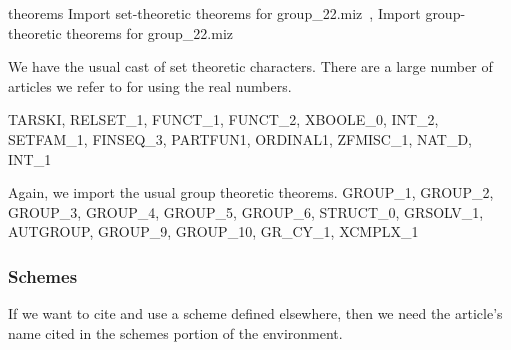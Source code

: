 \nwenddocs{}\endmoddef\nwstartdeflinemarkup{}\nwenddeflinemarkup
theorems
  \LA{}Import set-theoretic theorems for \code{}group{\_}22.miz\edoc{}~{\nwtagstyle{}}\RA{},
  \LA{}Import group-theoretic theorems for \code{}group{\_}22.miz\edoc{}~{\nwtagstyle{}}\RA{}
\nwendcode{}\nwdocspar

We have the usual cast of set theoretic characters. There are a large
number of articles we refer to for using the real numbers.

\nwenddocs{}\endmoddef\nwstartdeflinemarkup{}\nwenddeflinemarkup
TARSKI, RELSET_1, FUNCT_1, FUNCT_2, XBOOLE_0, INT_2, SETFAM_1, FINSEQ_3,
PARTFUN1, ORDINAL1, ZFMISC_1, NAT_D, INT_1
\nwendcode{}\nwdocspar

Again, we import the usual group theoretic theorems.
\nwenddocs{}\endmoddef\nwstartdeflinemarkup{}\nwenddeflinemarkup
GROUP_1, GROUP_2, GROUP_3, GROUP_4, GROUP_5, GROUP_6, STRUCT_0, GRSOLV_1,
AUTGROUP, GROUP_9, GROUP_10, GR_CY_1, XCMPLX_1
\nwendcode{}\nwdocspar

\subsubsection{Schemes}
If we want to cite and use a scheme defined elsewhere, then we need the
article's name cited in the {\Tt{}schemes\nwendquote} portion of the environment.

